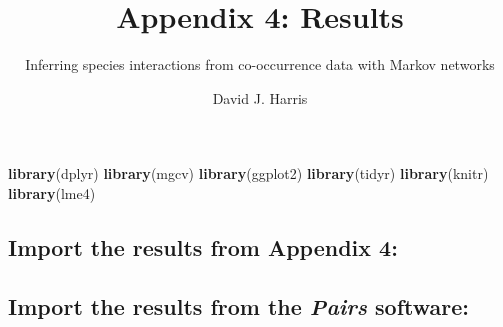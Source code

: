\documentclass[11pt,]{article}
\title{Appendix 4: Results}
\subtitle{Inferring species interactions from co-occurrence data with Markov
networks}
\author{David J. Harris}
\date{}
\newenvironment{Shaded}{\begin{snugshade}}{\end{snugshade}}
\newcommand{\KeywordTok}[1]{\textcolor[rgb]{0.13,0.29,0.53}{\textbf{{#1}}}}
\newcommand{\DataTypeTok}[1]{\textcolor[rgb]{0.13,0.29,0.53}{{#1}}}
\newcommand{\StringTok}[1]{\textcolor[rgb]{0.31,0.60,0.02}{{#1}}}
\newcommand{\OtherTok}[1]{\textcolor[rgb]{0.56,0.35,0.01}{{#1}}}
\newcommand{\NormalTok}[1]{{#1}}
\begin{document}
\maketitle

\begin{Shaded}
\begin{Highlighting}[]
\KeywordTok{library}\NormalTok{(dplyr)}
\KeywordTok{library}\NormalTok{(mgcv)}
\KeywordTok{library}\NormalTok{(ggplot2)}
\KeywordTok{library}\NormalTok{(tidyr)}
\KeywordTok{library}\NormalTok{(knitr)}
\KeywordTok{library}\NormalTok{(lme4)}
\end{Highlighting}
\end{Shaded}

\subsection{Import the results from Appendix
4:}\label{import-the-results-from-appendix-4}

\begin{Shaded}
\end{Shaded}

\subsection{\texorpdfstring{Import the results from the \emph{Pairs}
software:}{Import the results from the Pairs software:}}\label{import-the-results-from-the-pairs-software}
\end{document}
